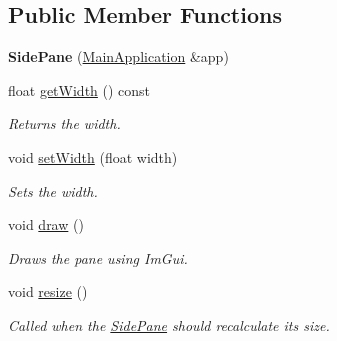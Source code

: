 \subsection*{Public Member Functions}
\begin{DoxyCompactItemize}
\item 
\mbox{\label{classpepr3d_1_1_side_pane_ac34e40627f74677c9acd8048fb6527e7}} 
{\bfseries Side\+Pane} (\mbox{\hyperlink{classpepr3d_1_1_main_application}{Main\+Application}} \&app)
\item 
\mbox{\label{classpepr3d_1_1_side_pane_a0d9965d55d1b631ec97a98698bbcd67b}} 
float \mbox{\hyperlink{classpepr3d_1_1_side_pane_a0d9965d55d1b631ec97a98698bbcd67b}{get\+Width}} () const
\begin{DoxyCompactList}\small\item\em Returns the width. \end{DoxyCompactList}\item 
\mbox{\label{classpepr3d_1_1_side_pane_a4418b3cd4e7c4e584d91f826d1e944b9}} 
void \mbox{\hyperlink{classpepr3d_1_1_side_pane_a4418b3cd4e7c4e584d91f826d1e944b9}{set\+Width}} (float width)
\begin{DoxyCompactList}\small\item\em Sets the width. \end{DoxyCompactList}\item 
\mbox{\label{classpepr3d_1_1_side_pane_a1ff5531d18ef9a1ad2149e59661c8d77}} 
void \mbox{\hyperlink{classpepr3d_1_1_side_pane_a1ff5531d18ef9a1ad2149e59661c8d77}{draw}} ()
\begin{DoxyCompactList}\small\item\em Draws the pane using Im\+Gui. \end{DoxyCompactList}\item 
\mbox{\label{classpepr3d_1_1_side_pane_a41774f95d968169688441c34a7b0e21b}} 
void \mbox{\hyperlink{classpepr3d_1_1_side_pane_a41774f95d968169688441c34a7b0e21b}{resize}} ()
\begin{DoxyCompactList}\small\item\em Called when the \mbox{\hyperlink{classpepr3d_1_1_side_pane}{Side\+Pane}} should recalculate its size. \end{DoxyCompactList}\item 

\end{DoxyCompactItemize}
